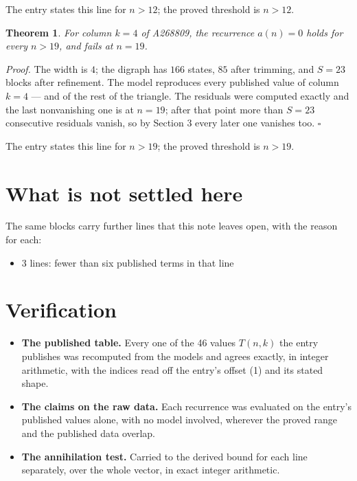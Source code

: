 \documentclass[11pt]{article}
\newtheorem{theorem}{Theorem}
\theoremstyle{definition}
\begin{document}
The entry states this line for $n > 12$; the proved threshold is $n > 12$.

\begin{theorem} For column $k = 4$ of A268809, the recurrence $a(n) = 0$ holds for every $n > 19$, and fails at $n = 19$.\end{theorem}

{\itshape Proof.} The width is $4$; the digraph has $166$ states, $85$ after trimming, and $S = 23$ blocks after refinement. The model reproduces every published value of column $k = 4$ --- and of the rest of the triangle. The residuals were computed exactly and the last nonvanishing one is at $n = 19$; after that point more than $S = 23$ consecutive residuals vanish, so by Section 3 every later one vanishes too. $\square$

The entry states this line for $n > 19$; the proved threshold is $n > 19$.

\section{What is not settled here}

The same blocks carry further lines that this note leaves open, with the reason for each:

\begin{itemize}

\item 3 lines: fewer than six published terms in that line

\end{itemize}

\section{Verification}

\begin{itemize}

\item {\bfseries The published table.} Every one of the 46 values $T(n,k)$ the entry publishes was recomputed from the models and agrees exactly, in integer arithmetic, with the indices read off the entry's offset (1) and its stated shape.

\item {\bfseries The claims on the raw data.} Each recurrence was evaluated on the entry's published values alone, with no model involved, wherever the proved range and the published data overlap.

\item {\bfseries The annihilation test.} Carried to the derived bound for each line separately, over the whole vector, in exact integer arithmetic.

\end{itemize}
\end{document}
